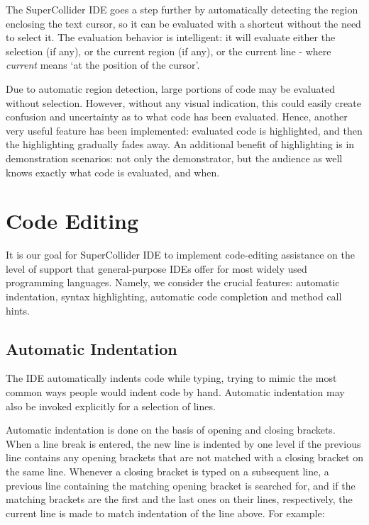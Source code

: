 \documentclass[11pt,a4paper]{article}
\begin{document}
The SuperCollider IDE goes a step further by automatically detecting the region enclosing the text cursor, so it can be
evaluated with a shortcut without the need to select it. The evaluation behavior is intelligent: it will evaluate
either the selection (if any), or the current region (if any), or the current line - where \emph{current} means `at the
position of the cursor'.

Due to automatic region detection, large portions of code may be evaluated without selection. However, without any
visual indication, this could easily create confusion and uncertainty as to what code has been evaluated. Hence,
another very useful feature has been implemented: evaluated code is highlighted, and then the highlighting gradually
fades away. An additional benefit of highlighting is in demonstration scenarios: not only the demonstrator, but the
audience as well knows exactly what code is evaluated, and when.

\section{Code Editing}

It is our goal for SuperCollider IDE to implement code-editing assistance on the level of support
that general-purpose IDEs offer for most widely used programming languages. Namely,
we consider the crucial features: automatic indentation, syntax highlighting, automatic code completion and method call
hints.

\subsection{Automatic Indentation}
\label{auto-indentation}

The IDE automatically indents code while typing, trying to mimic the most common ways people would indent code by hand.
Automatic indentation may also be invoked explicitly for a selection of lines.

Automatic indentation is done on the basis of opening and closing brackets. When a line break is entered, the new line
is indented by one level if the previous line contains any opening brackets that are not matched with a closing bracket
on the same line. Whenever a closing bracket is typed on a subsequent line, a previous line containing the matching
opening bracket is searched for, and if the matching brackets are the first and the last ones on their lines,
respectively, the current line is made to match indentation of the line above. For example:
\end{document}
